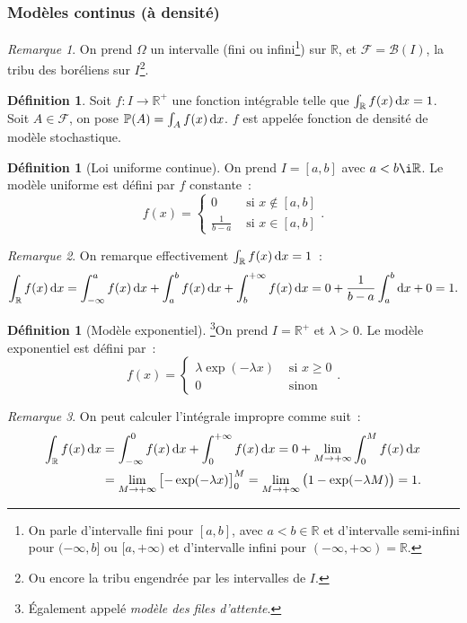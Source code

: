 \documentclass{article}
\renewcommand{\P}{\mathbb P}
\newcommand{\R}{\mathbb R}
\theoremstyle{definition}
\newtheorem{déf}[thm]{Définition}
\theoremstyle{remark}
\newtheorem*{rmq}{Remarque}
\begin{document}
		\subsubsection{Modèles continus (à densité)}
		\begin{rmq} On prend $\Omega$ un intervalle (fini ou infini\footnote{On parle d'intervalle fini pour $[a, b]$, avec $a < b \in \R$ et d'intervalle
		semi-infini pour $(-\infty, b]$ ou $[a, +\infty)$ et d'intervalle infini pour $(-\infty, +\infty) = \R$.}) sur $\R$, et $\mathcal F = \mathcal B(I)$,
		la tribu des boréliens sur $I$\footnote{Ou encore la tribu engendrée par les intervalles de $I$.}. \end{rmq}

		\begin{déf} Soit $f : I \to \R^+$ une fonction intégrable telle que $\int_\R f(x)\dif x = 1$. Soit $A \in \mathcal F$, on pose
		$\P(A) = \int_Af(x)\dif x$. $f$ est appelée fonction de densité de modèle stochastique. \end{déf}

		\begin{déf}[Loi uniforme continue] On prend $I = [a, b]$ avec $a < b \i \R$. Le modèle uniforme est défini par $f$ constante~:
		\[f(x) = \begin{cases}0 &\text{ si }x \not \in [a, b] \\\frac 1{b-a} &\text{ si }x \in [a, b]\end{cases}.\] \end{déf}

		\begin{rmq} On remarque effectivement $\int_\R f(x)\dif x = 1$~:
		\[\int_\R f(x)\dif x = \int_{-\infty}^a f(x)\dif x + \int_a^b f(x)\dif x + \int_b^{+\infty} f(x)\dif x = 0 + \frac 1{b-a}\int_a^b\dif x + 0 = 1.\]
		\end{rmq}

		\begin{déf}[Modèle exponentiel]\footnote{Également appelé \textit{modèle des files d'attente}.}\label{modèleExponentiel} On prend $I = \R^+$ et
		$\lambda > 0$. Le modèle exponentiel est défini par~:
		\[f(x) = \begin{cases}\lambda\exp(-\lambda x) &\text{ si }x \geq 0 \\ 0 &\text{ sinon}\end{cases}.\]
		\end{déf}

		\begin{rmq} On peut calculer l'intégrale impropre comme suit~:
		\[\begin{aligned}
			\int_\R f(x)\dif x &= \int_{-\infty}^0f(x)\dif x + \int_0^{+\infty}f(x)\dif x = 0 + \lim_{M \to +\infty}\int_0^Mf(x)\dif x \\
			&= \lim_{M \to +\infty}\left[-\exp(-\lambda x)\right]_0^M = \lim_{M \to +\infty}\left(1 - \exp(-\lambda M)\right) = 1.
		\end{aligned}\]
		\end{rmq}
\end{document}
